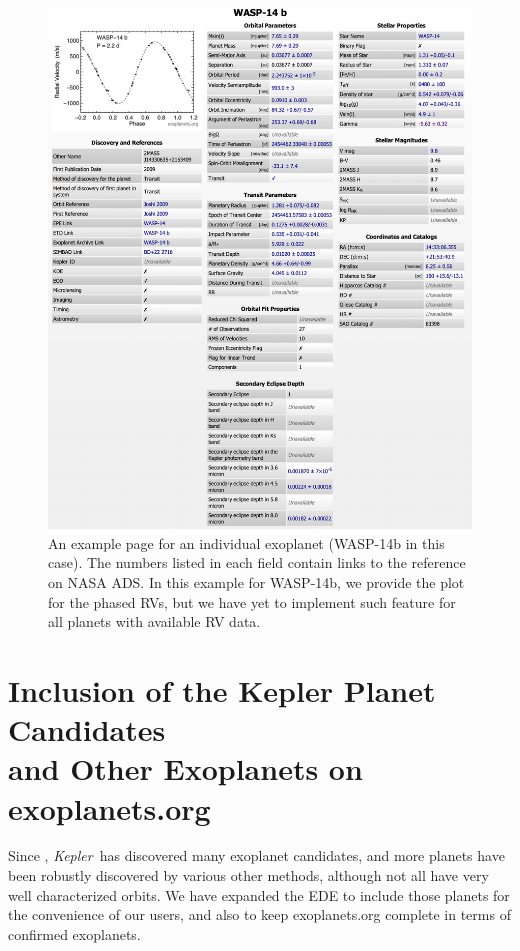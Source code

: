 \documentclass[11pt,preprint]{aastex}
\def\kepler{\textit{Kepler}}
\begin{document}
\begin{CJK*}{UTF8}{gbsn}
\begin{figure}[!htb]
\centering
\includegraphics[width=\textwidth]{fig/wasp-14b.eps}
\caption{An example page for an individual exoplanet (WASP-14b in this
  case). The numbers listed in each field contain links to the
  reference on NASA ADS. In this example for WASP-14b, we provide the plot
  for the phased RVs, but we have yet to implement such feature for all
  planets with available RV data.}
\label{fig:individual}
\end{figure}


\section{Inclusion of the Kepler Planet Candidates \\
  and Other Exoplanets on exoplanets.org}\label{sec:kepler}

Since \cite{Wright2011}, \kepler\ has discovered many exoplanet
candidates, and more planets have been robustly discovered by various
other methods, although not all have very well characterized orbits.  We have
expanded the EDE to include those planets for the convenience of
our users, and also to keep exoplanets.org complete in terms of confirmed
exoplanets.


\end{CJK*}
\end{document}
